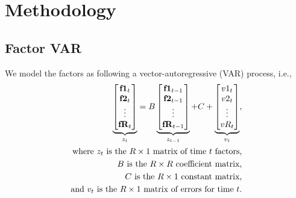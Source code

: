 \documentclass[11pt, letterpaper]{article}
\newcommand{\vv}[1]{\textcolor{black}{\mathbf{#1}}}
\begin{document}
\section{Methodology}

\subsection{Factor VAR}

We model the factors as following a vector-autoregressive (VAR) process, i.e., 
\begin{align*}
\underbrace{\begin{bmatrix}
	\vv{f1}_{t}\\
	\vv{f2}_{t}\\
	\vdots \\
	\vv{fR}_{t}
\end{bmatrix}}_{z_t}
=
B
\underbrace{\begin{bmatrix}
	\vv{f1}_{t-1}\\
	\vv{f2}_{t-1}\\
	\vdots \\
	\vv{fR}_{t-1}
\end{bmatrix}}_{z_{t-1}}
+
C
+
\underbrace{\begin{bmatrix}
v1_t\\
v2_t\\
\vdots\\
vR_t
\end{bmatrix}}_{v_t},\\
\text{where $z_t$ is the $R \times 1$ matrix of time $t$ factors,}\\
\text{$B$ is the $R \times R$ coefficient matrix,}\\
\text{$C$ is the $R \times 1$ constant matrix,}\\
\text{and $v_t$ is the $R \times 1$ matrix of errors for time $t$.}
\end{align*}
\end{document}
